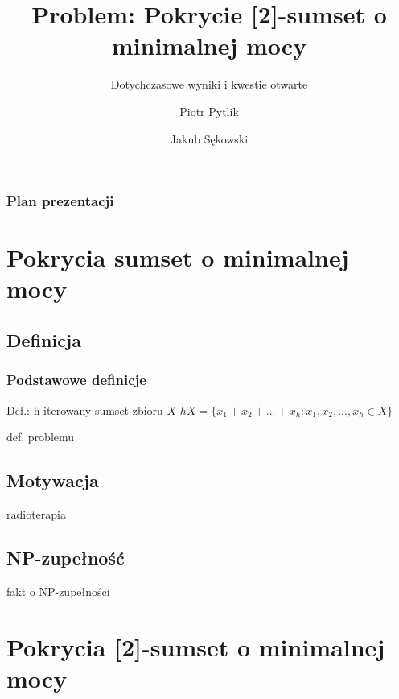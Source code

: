 \documentclass{beamer}
\begin{document}
\title{Problem: Pokrycie [2]-sumset o minimalnej mocy}
\subtitle{Dotychczasowe wyniki i kwestie otwarte}
\author[Piotr Pytlik \& Jakub Sękowski]{Piotr Pytlik \and Jakub Sękowski}

\begin{frame}
	\titlepage
\end{frame}

\begin{frame}
	\frametitle{Plan prezentacji}
	\tableofcontents
\end{frame}

\section{Pokrycia sumset o minimalnej mocy}
	\subsection{Definicja}
		\begin{frame} \frametitle{Podstawowe definicje}
            Def.: h-iterowany sumset zbioru $ X $
            $ hX = \lbrace x_1 + x_2 + ... + x_h : x_1,x_2,...,x_h \in X \rbrace $
            
            \vspace{\baselineskip}
            
			def. problemu
		\end{frame}
		
	\subsection{Motywacja}
		\begin{frame}
			radioterapia
		\end{frame}	
			
	\subsection{NP-zupełność}
		\begin{frame}
			fakt o NP-zupełności
		\end{frame}
		
\section{Pokrycia [2]-sumset o minimalnej mocy}
\end{document}
